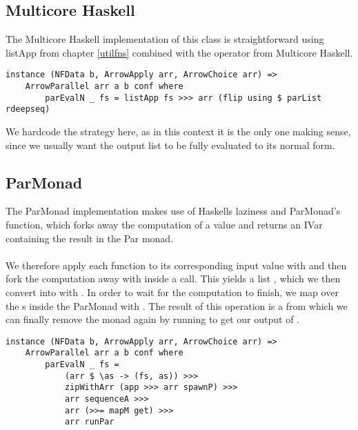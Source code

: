\subsection{Multicore Haskell}
The Multicore Haskell implementation of this class is straightforward using listApp from chapter \ref{utilfns} combined with the  operator from Multicore Haskell.
\begin{lstlisting}[frame=htrbl]
instance (NFData b, ArrowApply arr, ArrowChoice arr) =>
	ArrowParallel arr a b conf where
		parEvalN _ fs = listApp fs >>> arr (flip using $ parList rdeepseq)
\end{lstlisting}
We hardcode the  strategy here, as in this context it is the only one making sense, since we usually want the output list to be fully evaluated to its normal form.

\subsection{ParMonad}
The ParMonad implementation makes use of Haskells laziness and ParMonad's  function, which forks away the computation of a value and returns an IVar containing the result in the Par monad.
\\\\
We therefore apply each function to its corresponding input value with  and then fork the computation away with  inside a  call. This yields a list , which we then convert into  with . In order to wait for the computation to finish, we map over the s inside the ParMonad with . The result of this operation is a  from which we can finally remove the monad again by running  to get our output of \code{[b]}.
\begin{lstlisting}[frame=htrbl]
instance (NFData b, ArrowApply arr, ArrowChoice arr) =>
	ArrowParallel arr a b conf where
		parEvalN _ fs = 
			(arr $ \as -> (fs, as)) >>>
			zipWithArr (app >>> arr spawnP) >>>
			arr sequenceA >>>
			arr (>>= mapM get) >>>
			arr runPar
\end{lstlisting}

